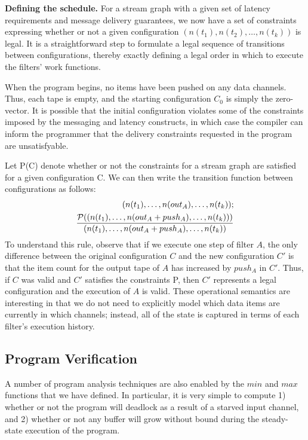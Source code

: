 {\bf Defining the schedule.}  For a stream graph with a given set of
latency requirements and message delivery guarantees, we now have a
set of constraints expressing whether or not a given configuration
$(n(t_1), n(t_2), \dots, n(t_k))$ is legal.  It is a straightforward
step to formulate a legal sequence of transitions between
configurations, thereby exactly defining a legal order in which to
execute the filters' work functions.

When the program begins, no items have been pushed on any data
channels.  Thus, each tape is empty, and the starting configuration
$C_0$ is simply the zero-vector.  It is possible that the initial
configuration violates some of the constraints imposed by the
messaging and latency constructs, in which case the compiler can
inform the programmer that the delivery constraints requested in the
program are unsatisfyable.

Let {\cal P}(C) denote whether or not the constraints for a stream
graph are satisfied for a given configuration C.  We can then write
the transition function between configurations as follows:
\begin{eqnarray*}
(n(t_1), \dots , n(out_A), \dots, n(t_k)); \\ \frac{{\cal P}((n(t_1), \dots , n(out_A + push_A), \dots, n(t_k)))}{(n(t_1), \dots , n(out_A + push_A), \dots, n(t_k))}
\end{eqnarray*}
To understand this rule, observe that if we execute one step of filter
$A$, the only difference between the original configuration $C$ and
the new configuration $C'$ is that the item count for the output tape
of $A$ has increased by $push_A$ in $C'$.  Thus, if $C$ was valid and
$C'$ satisfies the constraints {\cal P}, then $C'$ represents a legal
configuration and the execution of $A$ is valid.  These operational
semantics are interesting in that we do not need to explicitly model
which data items are currently in which channels; instead, all of the
state is captured in terms of each filter's execution history.

\subsection{Program Verification}

A number of program analysis techniques are also enabled by the $min$
and $max$ functions that we have defined.  In particular, it is very
simple to compute 1) whether or not the program will deadlock as a
result of a starved input channel, and 2) whether or not any buffer
will grow without bound during the steady-state execution of the
program.

